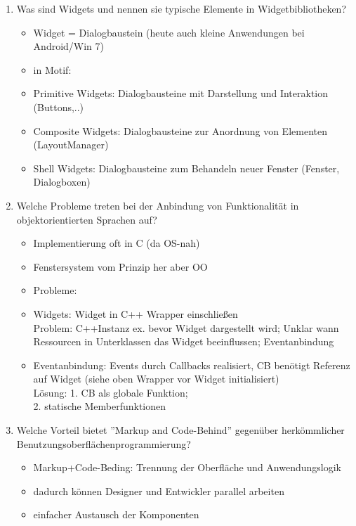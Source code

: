 \begin{enumerate}
	\item Was sind Widgets und nennen sie typische Elemente in
	Widgetbibliotheken?
	\begin{itemize}
		\item Widget = Dialogbaustein (heute auch kleine Anwendungen bei Android/Win 7)
		\item in Motif: 
		\item Primitive Widgets: Dialogbausteine mit Darstellung und Interaktion (Buttons,..)
		\item Composite Widgets: Dialogbausteine zur Anordnung von Elementen (LayoutManager)
		\item Shell Widgets: Dialogbausteine zum Behandeln neuer Fenster (Fenster, Dialogboxen)
	\end{itemize}
	
	\item Welche Probleme treten bei der Anbindung von Funktionalität in objektorientierten Sprachen auf?
	\begin{itemize}
		\item Implementierung  oft in C (da OS-nah)
		\item Fenstersystem vom Prinzip her aber OO
		\item Probleme:
		\item Widgets: Widget in C++ Wrapper einschließen\\
		Problem: C++Instanz ex. bevor Widget dargestellt wird; Unklar wann Ressourcen in Unterklassen das Widget beeinflussen; Eventanbindung
		\item Eventanbindung: Events durch Callbacks realisiert, CB benötigt Referenz auf Widget (siehe oben Wrapper vor Widget initialisiert)\\
		Lösung: 1. CB als globale Funktion;\\
		2. statische Memberfunktionen 
	\end{itemize}
	
	\item Welche Vorteil bietet ''Markup and Code-Behind'' gegenüber herkömmlicher Benutzungsoberflächenprogrammierung?
	\begin{itemize}
		\item Markup+Code-Beding: Trennung der Oberfläche und Anwendungslogik
		\item dadurch können Designer und Entwickler parallel arbeiten
		\item einfacher Austausch der Komponenten
	\end{itemize}
	

\end{enumerate}
